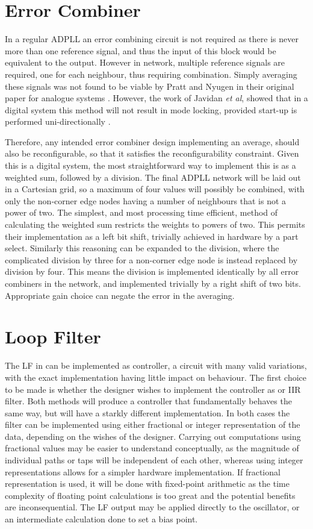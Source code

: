\section{Error Combiner}
In a regular \ac{ADPLL} an error combining circuit is not required as there is never more than one reference signal, and thus the input of this block would be equivalent to the output. However in  network, multiple reference signals are required, one for each neighbour, thus requiring combination. Simply averaging these signals was not found to be viable by Pratt and Nyugen in their original paper for analogue systems \cite{pratt1995distributed}. However, the work of Javidan \textit{et al}, showed that in a digital system this method will not result in mode locking, provided start-up is performed uni-directionally \cite{javidan2011all}.

Therefore, any intended error combiner design implementing an average, should also be reconfigurable, so that it satisfies the reconfigurability constraint. Given this is a digital system, the most straightforward way to implement this is as a weighted sum, followed by a division. The final \ac{ADPLL} network will be laid out in a Cartesian grid, so a maximum of four values will possibly be combined, with only the non-corner edge nodes having a number of neighbours that is not a power of two.
The simplest, and most processing time efficient, method of calculating the weighted sum restricts the weights to powers of two. This permits their implementation as a left bit shift, trivially achieved in hardware by a part select.
Similarly this reasoning can be expanded to the division, where the complicated division by three for a non-corner edge node is instead replaced by division by four. This means the division is implemented identically by all error combiners in the network, and implemented trivially by a right shift of two bits. Appropriate gain choice can negate the error in the averaging.

\section{Loop Filter}
The \acl{LF} in  can be implemented as  controller, a circuit with many valid variations, with the exact implementation having little impact on behaviour. The first choice to be made is whether the designer wishes to implement the controller as  or \ac{IIR} filter. Both methods will produce a controller that fundamentally behaves the same way, but will have a starkly different implementation. In both cases the filter can be implemented using either fractional or integer representation of the data, depending on the wishes of the designer. Carrying out computations using fractional values may be easier to understand conceptually, as the magnitude of individual paths or taps will be independent of each other, whereas using integer representations allows for a simpler hardware implementation. If fractional representation is used, it will be done with fixed-point arithmetic as the time complexity of floating point calculations is too great and the potential benefits are inconsequential. The \acl{LF} output may be applied directly to the oscillator, or an intermediate calculation done to set a bias point.


